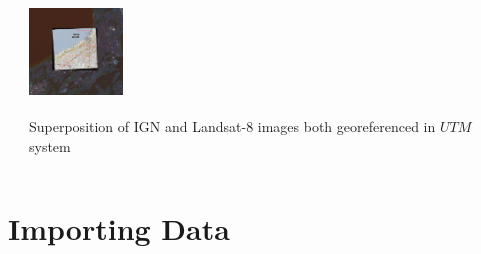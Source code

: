 \documentclass[c]{beamer}
\begin{document}
\begin{frame}
\begin{columns}[t]
\begin{column}{0.30\textwidth}
\end{column}
\begin{column}{0.30\textwidth}
\begin{overlayarea}{\linewidth}{3cm}
  \centering\vfill
  \includegraphics[height=2.5cm,width=2.5cm]{images/georeferencing/qgis-superposition0.png}
\end{overlayarea}
\begin{overlayarea}{\linewidth}{2cm}
  \centering
  \scriptsize Superposition of IGN and Landsat-8 images both georeferenced in $UTM$ system\par
\end{overlayarea}
\end{column}
\end{columns}

\end{frame}

\section{Importing Data}
\end{document}
